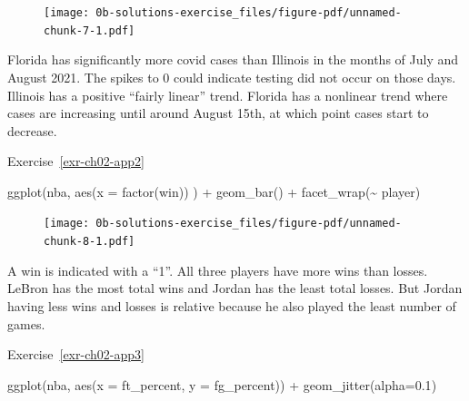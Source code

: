 \documentclass[
  letterpaper,
  DIV=11,
  numbers=noendperiod]{scrreprt}
\newenvironment{Shaded}{\begin{snugshade}}{\end{snugshade}}
\newcommand{\AttributeTok}[1]{\textcolor[rgb]{0.40,0.45,0.13}{#1}}
\newcommand{\FloatTok}[1]{\textcolor[rgb]{0.68,0.00,0.00}{#1}}
\newcommand{\FunctionTok}[1]{\textcolor[rgb]{0.28,0.35,0.67}{#1}}
\newcommand{\NormalTok}[1]{\textcolor[rgb]{0.00,0.23,0.31}{#1}}
\newcommand{\SpecialCharTok}[1]{\textcolor[rgb]{0.37,0.37,0.37}{#1}}
\theoremstyle{definition}
\theoremstyle{remark}
\begin{document}
\begin{figure}[H]

{\centering \texttt{[image: 0b-solutions-exercise\_files/figure-pdf/unnamed-chunk-7-1.pdf]}

}

\end{figure}

Florida has significantly more covid cases than Illinois in the months
of July and August 2021. The spikes to 0 could indicate testing did not
occur on those days. Illinois has a positive ``fairly linear'' trend.
Florida has a nonlinear trend where cases are increasing until around
August 15th, at which point cases start to decrease.

Exercise~\ref{exr-ch02-app2}

\begin{Shaded}
\begin{Highlighting}[]
\FunctionTok{ggplot}\NormalTok{(nba, }\FunctionTok{aes}\NormalTok{(}\AttributeTok{x =} \FunctionTok{factor}\NormalTok{(win)) ) }\SpecialCharTok{+}
  \FunctionTok{geom\_bar}\NormalTok{() }\SpecialCharTok{+}
  \FunctionTok{facet\_wrap}\NormalTok{(}\SpecialCharTok{\textasciitilde{}}\NormalTok{ player)}
\end{Highlighting}
\end{Shaded}

\begin{figure}[H]

{\centering \texttt{[image: 0b-solutions-exercise\_files/figure-pdf/unnamed-chunk-8-1.pdf]}

}

\end{figure}

A win is indicated with a ``1''. All three players have more wins than
losses. LeBron has the most total wins and Jordan has the least total
losses. But Jordan having less wins and losses is relative because he
also played the least number of games.

Exercise~\ref{exr-ch02-app3}

\begin{Shaded}
\begin{Highlighting}[]
\FunctionTok{ggplot}\NormalTok{(nba, }\FunctionTok{aes}\NormalTok{(}\AttributeTok{x =}\NormalTok{ ft\_percent, }\AttributeTok{y =}\NormalTok{ fg\_percent)) }\SpecialCharTok{+}
  \FunctionTok{geom\_jitter}\NormalTok{(}\AttributeTok{alpha=}\FloatTok{0.1}\NormalTok{)}
\end{Highlighting}
\end{Shaded}
\end{document}
